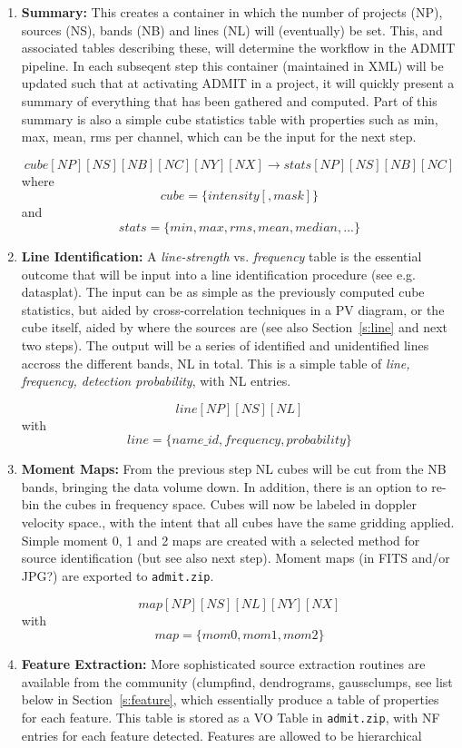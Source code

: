 \documentclass[preprint]{aastex} %
\begin{document}
\begin{enumerate}

\item
{\bf Summary:} This creates a container in which the number of projects (NP),
sources (NS), bands (NB) and lines (NL) will (eventually) be set. This, and 
associated tables describing these, will determine the workflow in the
ADMIT pipeline. In each subseqent step this container (maintained in XML) will
be updated such that at activating ADMIT in a project, it will quickly
present a summary of everything that has been gathered and computed. Part of
this summary is also a simple cube statistics table with properties such as 
min, max, mean, rms per channel, which can be the input for the next step.

$$
cube[NP][NS][NB][NC][NY][NX] \rightarrow stats[NP][NS][NB][NC]
$$
where 
$$
     cube = \{ intensity [, mask] \}
$$
and
$$
stats = \{min,max,rms,mean,median,...\}
$$

\item
{\bf Line Identification:}
A {\it line-strength} vs. {\it frequency} table is the essential outcome
that will be input into a line identification procedure (see e.g. datasplat).
The input can be as simple as the previously computed cube statistics, 
but aided by cross-correlation techniques in a PV diagram, or the cube itself,
aided by where the sources are (see also Section~\ref{s:line} and next two steps).
The output will be a series of identified and unidentified lines accross the different
bands, NL in total. This is a simple table of 
{\it line, frequency, detection probability}, with NL entries.

$$
    line[NP][NS][NL]
$$
with
$$
    line = \{name\_id, frequency, probability\}
$$

\item
{\bf Moment Maps:}
From the previous step NL cubes will be cut from the NB bands, bringing the data
volume down. In addition, there is an option to re-bin the cubes in frequency
space. Cubes will now be labeled in doppler velocity space., with the intent
that all cubes have the same gridding applied.  Simple moment 0, 1 and 2 maps
are created with a selected method for source identification (but see also next
step). Moment maps (in FITS and/or JPG?) are exported to {\tt admit.zip}.

$$
    map[NP][NS][NL][NY][NX]
$$
with
$$
    map = \{mom0, mom1, mom2\}
$$

\item
{\bf Feature Extraction:}
More sophisticated source extraction routines are available from the community
(clumpfind, dendrograms, gaussclumps, see list below in Section~\ref{s:feature}, 
which essentially produce
a table of properties for each feature. This table is stored as a VO Table 
in {\tt admit.zip}, with NF entries for each feature detected. Features
are allowed to be hierarchical


\end{enumerate}
\end{document}
